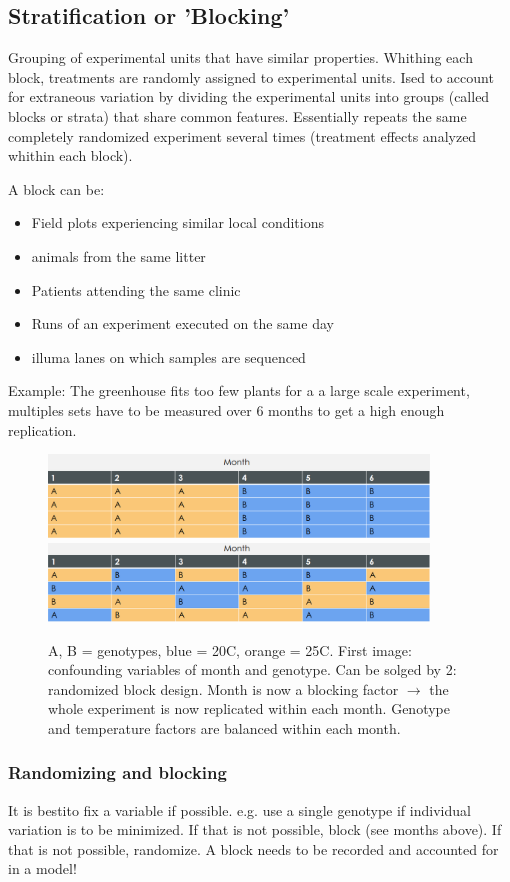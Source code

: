 \documentclass{article}
\begin{document}
\subsection{Stratification or 'Blocking'}
Grouping of experimental units that have similar properties. Whithing each block, treatments are randomly assigned to experimental units. Ised to account for extraneous variation by dividing the experimental units into groups (called blocks or strata) that share common features. Essentially repeats the same completely randomized experiment several times (treatment effects analyzed whithin each block).\par 
A block can be:
\begin{itemize}
\item Field plots experiencing similar local conditions
\item animals from the same litter
\item Patients attending the same clinic
\item Runs of an experiment executed on the same day
\item illuma lanes on which samples are sequenced
\end{itemize}
Example:
The greenhouse fits too few plants for a a large scale experiment, multiples sets have to be measured over 6 months to get a high enough replication.
\begin{figure}[H]
\centering
\includegraphics[width = 0.9\textwidth]{exp-design/greenhouse1.png}
\includegraphics[width = 0.9\textwidth]{exp-design/greenhouse2.png}
\caption{A, B = genotypes, blue = 20C, orange = 25C. First image: confounding variables of month and genotype. Can be solged by 2: randomized block design. Month is now a blocking factor $\rightarrow$ the whole experiment is now replicated within each month. Genotype and temperature factors are balanced within each month.}
\end{figure}

\subsubsection{Randomizing and blocking}
It is bestito fix a variable if possible. e.g. use a single genotype if individual variation is to be minimized. If that is not possible, block (see months above). If that is not possible, randomize. A block needs to be recorded and accounted for in a model!\par 
\end{document}
